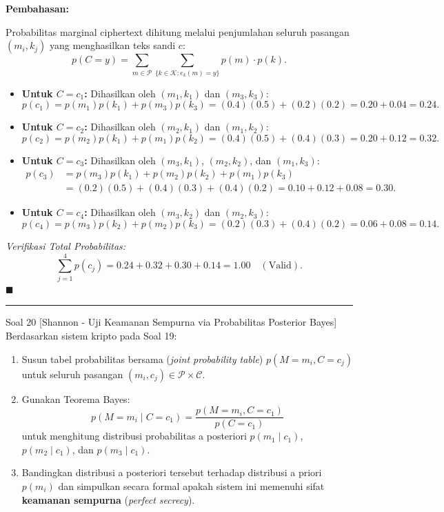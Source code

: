\documentclass[11pt,a4paper]{article}
\newenvironment{solusi}{\noindent\textbf{\textsf{Pembahasan:}}\par\vspace{0.2em}}{\hfill$\blacksquare$\vspace{1em}\par\hrule\vspace{1em}}
\begin{document}
\begin{solusi}
Probabilitas marginal ciphertext dihitung melalui penjumlahan seluruh pasangan $(m_i, k_j)$ yang menghasilkan teks sandi $c$:
\[
p(C = y) = \sum_{m \in \mathcal{P}} \sum_{\{k \in \mathcal{K} : e_k(m) = y\}} p(m) \cdot p(k).
\]
\begin{itemize}[leftmargin=*]
    \item \textbf{Untuk $C = c_1$:} Dihasilkan oleh $(m_1, k_1)$ dan $(m_3, k_3)$:
    \[
    p(c_1) = p(m_1)p(k_1) + p(m_3)p(k_3) = (0.4)(0.5) + (0.2)(0.2) = 0.20 + 0.04 = \mathbf{0.24}.
    \]
    \item \textbf{Untuk $C = c_2$:} Dihasilkan oleh $(m_2, k_1)$ dan $(m_1, k_2)$:
    \[
    p(c_2) = p(m_2)p(k_1) + p(m_1)p(k_2) = (0.4)(0.5) + (0.4)(0.3) = 0.20 + 0.12 = \mathbf{0.32}.
    \]
    \item \textbf{Untuk $C = c_3$:} Dihasilkan oleh $(m_3, k_1)$, $(m_2, k_2)$, dan $(m_1, k_3)$:
    \begin{align*}
    p(c_3) &= p(m_3)p(k_1) + p(m_2)p(k_2) + p(m_1)p(k_3) \\
    &= (0.2)(0.5) + (0.4)(0.3) + (0.4)(0.2) = 0.10 + 0.12 + 0.08 = \mathbf{0.30}.
    \end{align*}
    \item \textbf{Untuk $C = c_4$:} Dihasilkan oleh $(m_3, k_2)$ dan $(m_2, k_3)$:
    \[
    p(c_4) = p(m_3)p(k_2) + p(m_2)p(k_3) = (0.2)(0.3) + (0.4)(0.2) = 0.06 + 0.08 = \mathbf{0.14}.
    \]
\end{itemize}
\textit{Verifikasi Total Probabilitas:}
\[
\sum_{j=1}^4 p(c_j) = 0.24 + 0.32 + 0.30 + 0.14 = \mathbf{1.00} \quad (\text{Valid}).
\]
\end{solusi}


\begin{soalshannon}{Soal 20 [Shannon - Uji Keamanan Sempurna via Probabilitas Posterior Bayes]}
Berdasarkan sistem kripto pada Soal 19:
\begin{enumerate}[label=(\alph*)]
    \item Susun tabel probabilitas bersama (\textit{joint probability table}) $p(M = m_i, C = c_j)$ untuk seluruh pasangan $(m_i, c_j) \in \mathcal{P} \times \mathcal{C}$.
    \item Gunakan Teorema Bayes:
    \[
    p(M = m_i \mid C = c_1) = \frac{p(M = m_i, C = c_1)}{p(C = c_1)}
    \]
    untuk menghitung distribusi probabilitas a posteriori $p(m_1 \mid c_1)$, $p(m_2 \mid c_1)$, dan $p(m_3 \mid c_1)$.
    \item Bandingkan distribusi a posteriori tersebut terhadap distribusi a priori $p(m_i)$ dan simpulkan secara formal apakah sistem ini memenuhi sifat \textbf{keamanan sempurna} (\textit{perfect secrecy}).
\end{enumerate}
\end{soalshannon}
\end{document}
